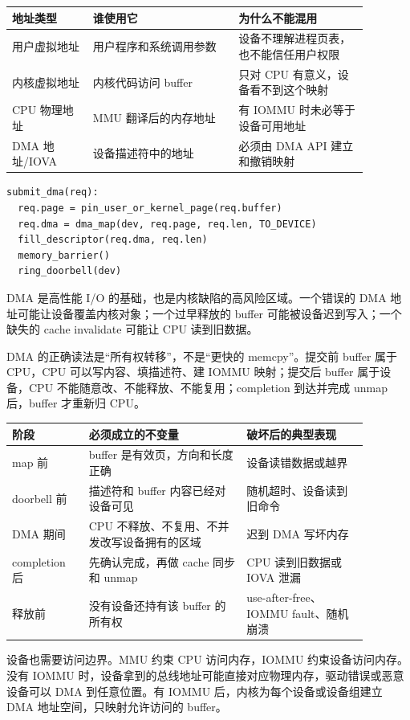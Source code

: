 \begin{longtable}{p{0.2\linewidth}p{0.36\linewidth}p{0.32\linewidth}}
\toprule
地址类型 & 谁使用它 & 为什么不能混用 \\
\midrule
用户虚拟地址 & 用户程序和系统调用参数 & 设备不理解进程页表，也不能信任用户权限 \\
内核虚拟地址 & 内核代码访问 buffer & 只对 CPU 有意义，设备看不到这个映射 \\
CPU 物理地址 & MMU 翻译后的内存地址 & 有 IOMMU 时未必等于设备可用地址 \\
DMA 地址/IOVA & 设备描述符中的地址 & 必须由 DMA API 建立和撤销映射 \\
\bottomrule
\end{longtable}

\begin{lstlisting}
submit_dma(req):
  req.page = pin_user_or_kernel_page(req.buffer)
  req.dma = dma_map(dev, req.page, req.len, TO_DEVICE)
  fill_descriptor(req.dma, req.len)
  memory_barrier()
  ring_doorbell(dev)
\end{lstlisting}

DMA 是高性能 I/O 的基础，也是内核缺陷的高风险区域。一个错误的 DMA 地址可能让设备覆盖内核对象；一个过早释放的 buffer 可能被设备迟到写入；一个缺失的 cache invalidate 可能让 CPU 读到旧数据。

DMA 的正确读法是“所有权转移”，不是“更快的 memcpy”。提交前 buffer 属于 CPU，CPU 可以写内容、填描述符、建 IOMMU 映射；提交后 buffer 属于设备，CPU 不能随意改、不能释放、不能复用；completion 到达并完成 unmap 后，buffer 才重新归 CPU。

\begin{longtable}{p{0.19\linewidth}p{0.39\linewidth}p{0.3\linewidth}}
\toprule
阶段 & 必须成立的不变量 & 破坏后的典型表现 \\
\midrule
map 前 & buffer 是有效页，方向和长度正确 & 设备读错数据或越界 \\
doorbell 前 & 描述符和 buffer 内容已经对设备可见 & 随机超时、设备读到旧命令 \\
DMA 期间 & CPU 不释放、不复用、不并发改写设备拥有的区域 & 迟到 DMA 写坏内存 \\
completion 后 & 先确认完成，再做 cache 同步和 unmap & CPU 读到旧数据或 IOVA 泄漏 \\
释放前 & 没有设备还持有该 buffer 的所有权 & use-after-free、IOMMU fault、随机崩溃 \\
\bottomrule
\end{longtable}

设备也需要访问边界。MMU 约束 CPU 访问内存，IOMMU 约束设备访问内存。没有 IOMMU 时，设备拿到的总线地址可能直接对应物理内存，驱动错误或恶意设备可以 DMA 到任意位置。有 IOMMU 后，内核为每个设备或设备组建立 DMA 地址空间，只映射允许访问的 buffer。

